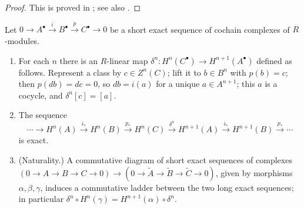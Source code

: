 \begin{proof}
This is proved in ; see also \cite[Section 1.3]{Weibel}.
\end{proof}

\begin{theorem}\label{thm:cohomology:les}
Let $0\to A^\bullet\xrightarrow{i}B^\bullet\xrightarrow{p}C^\bullet\to0$ be a short exact sequence of cochain complexes of $R$-modules.
\begin{enumerate}[label=(\roman*)]
\item For each $n$ there is an $R$-linear map $\delta^n\colon H^n(C^\bullet)\to H^{n+1}(A^\bullet)$ defined as follows. Represent a class by $c\in Z^n(C)$; lift it
to $b\in B^n$ with $p(b)=c$; then $p(db)=dc=0$, so $db=i(a)$ for a unique $a\in A^{n+1}$; this $a$ is a cocycle, and $\delta^n[c]=[a]$.
\item The sequence
\[
\cdots\to H^n(A)\xrightarrow{i_*}H^n(B)\xrightarrow{p_*}H^n(C)\xrightarrow{\delta^n}H^{n+1}(A)\xrightarrow{i_*}H^{n+1}(B)\xrightarrow{p_*}\cdots
\]
is exact.
\item (Naturality.) A commutative diagram of short exact sequences of complexes
$(0\to A\to B\to C\to0)\to(0\to\tilde A\to\tilde B\to\tilde C\to0)$, given by morphisms $\alpha,\beta,\gamma$, induces a commutative ladder between the two long
exact sequences; in particular $\delta^n\circ H^n(\gamma)=H^{n+1}(\alpha)\circ\delta^n$.
\end{enumerate}
\end{theorem}

